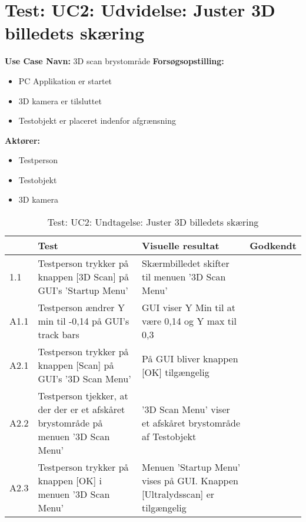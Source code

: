 \section{Test: UC2: Udvidelse: Juster 3D billedets skæring}
\textbf{Use Case Navn:} 3D scan brystområde \newline
\textbf{Forsøgsopstilling:}
\begin{itemize}
\item PC Applikation er startet
\item 3D kamera er tilsluttet
\item Testobjekt er placeret indenfor afgrænsning 
\end{itemize}  
\textbf{Aktører:}
\begin{itemize}
\item Testperson
\item Testobjekt
\item 3D kamera
\end{itemize}  

\begin{table}[htb]
\begin{tabularx}{\textwidth}{|p{0.7cm}|X|X|p{2cm}|}
\hline
\textbf{} & \textbf{Test} & \textbf{Visuelle resultat} &\textbf{Godkendt} \\\hline
1.1 & Testperson trykker på knappen [3D Scan] på GUI's 'Startup Menu' & Skærmbilledet skifter til menuen '3D Scan Menu' &  \\\hline
A1.1 & Testperson ændrer Y min til -0,14 på GUI's track bars & GUI viser Y Min til at være 0,14 og Y max til 0,3  & \\\hline
A2.1 & Testperson trykker på knappen [Scan] på GUI's '3D Scan Menu' & På GUI bliver knappen [OK] tilgængelig &  \\\hline
A2.2 & Testperson tjekker, at der der er et afskåret brystområde på menuen '3D Scan Menu' &  '3D Scan Menu' viser et afskåret brystområde af Testobjekt & \\\hline
A2.3 & Testperson trykker på knappen [OK] i menuen '3D Scan Menu' & Menuen 'Startup Menu' vises på GUI. Knappen [Ultralydsscan] er tilgængelig & \\\hline
\end{tabularx}
    \caption{Test: UC2: Undtagelse: Juster 3D billedets skæring}
    \label{uc2_test_e_1_label}  
\end{table}
\newpage


